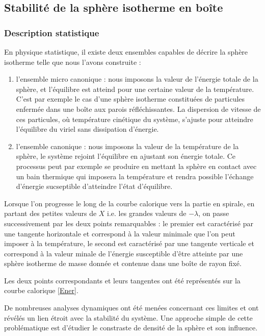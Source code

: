\subsection{Stabilité de la sphère isotherme en boîte}
\subsubsection{Description statistique}
	En physique statistique, il existe deux ensembles capables de décrire la sphère isotherme telle que nous l'avons construite :
	\begin{enumerate}
		\item l'ensemble micro canonique : nous imposons la valeur de l'énergie totale de la sphère, et l'équilibre est atteind pour une certaine valeur de la température. C'est par exemple le cas d'une sphère isotherme constituées de particules enfermée dans une boîte aux parois réfléchissantes. La dispersion de vitesse de ces particules, où température cinétique du système, s'ajuste pour atteindre l'équilibre du viriel sans dissipation d'énergie.
		
		\item l'ensemble canonique : nous imposons la valeur de la température de la sphère, le système rejoint l'équilibre en ajustant son énergie totale. Ce processus peut par exemple se produire en mettant la sphère en contact avec un bain thermique qui imposera la température et rendra possible l'échange d'énergie sucseptible d'atteindre l'état d'équilibre.
		
	\end{enumerate}

	Lorsque l'on progresse le long de la courbe calorique vers la partie en spirale, en partant des petites valeurs de $X$ i.e. les grandes valeurs de $-\lambda$, on passe successivement par les deux points remarquables : le premier est caractérisé par une tangente horizontale et correspond à la valeur minimale que l'on peut imposer à la température, le second est caractérisé par une tangente verticale et correspond à la valeur minale de l'énergie susceptible d'être atteinte par une sphère isotherme de masse donnée et contenue dans une boîte de rayon fixé. 
	
	Les deux points correspondants et leurs tangentes ont été représentés sur la courbe calorique \ref{Ener}.
	
	De nombreuses analyses dynamiques ont été menées concernant ces limites et ont révélés un lien étroit avec la stabilité du système. Une approche simple de cette problématique est d'étudier le constraste de densité de la sphère et son influence.
	
